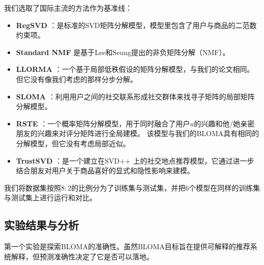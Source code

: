 我们选取了国际主流的方法作为基准线：
\begin{itemize}
\item \textbf{RegSVD} ：是标准的SVD矩阵分解模型，模型里包含了用户与商品的二范数约束项。
\item \textbf{Standard NMF} 是基于Lee和Seung提出的非负矩阵分解（NMF）。
\item \textbf{LLORMA} ：一个基于局部低秩假设的矩阵分解模型，与我们的论文相同。但它没有像我们考虑的那样分步分解。

\item \textbf{SLOMA} ：利用用户之间的社交联系形成社交群体来找寻子矩阵的局部矩阵分解模型。

\item \textbf{RSTE} ：一个概率矩阵分解模型，用于同时融合了用户$u$的兴趣和他/她亲密朋友的兴趣来对评分矩阵进行全局建模。 该模型与我们的BLOMA具有相同的分解模型，但它没有考虑局部近似。
\item \textbf{TrustSVD} ：是一个建立在SVD++ 上的社交地点推荐模型，它通过进一步结合朋友对用户关于商品喜好的显式和隐性影响来建模。
\end{itemize}
我们将数据集按照$8:2$的比例分为了训练集与测试集，并把6个模型在同样的训练集与测试集上进行运行和对比。

\subsection{实验结果与分析}
第一个实验是探索BLOMA的准确性。虽然BLOMA目标旨在提供可解释的推荐系统解释，但预测准确性决定了它是否可以落地。

